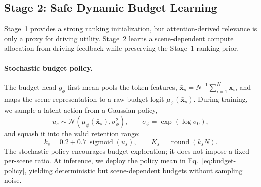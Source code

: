 \documentclass[letterpaper]{article} %
\begin{document}
\subsection{Stage 2: Safe Dynamic Budget Learning}
\label{sec:rl}

Stage~1 provides a strong ranking initialization, but attention-derived
relevance is only a proxy for driving utility. Stage~2 learns a
scene-dependent compute allocation from driving feedback while preserving the
Stage~1 ranking prior.

\paragraph{Stochastic budget policy.}
The budget head $g_\phi$ first mean-pools the token features,
$\bar{\mathbf{x}}_s=N^{-1}\sum_{i=1}^{N}\mathbf{x}_i$, and maps the scene
representation to a raw budget logit $\mu_\phi(\bar{\mathbf{x}}_s)$. During
training, we sample a latent action from a Gaussian policy,
\begin{equation}
 u_s \sim \mathcal{N}\!\left(
 \mu_\phi(\bar{\mathbf{x}}_s),\sigma_\phi^2\right),
 \qquad \sigma_\phi=\exp(\log\sigma_0),
\end{equation}
and squash it into the valid retention range:
\begin{equation}
 k_s = 0.2 + 0.7\,\operatorname{sigmoid}(u_s),
 \qquad K_s=\operatorname{round}(k_sN).
\label{eq:budget-policy}
\end{equation}
The stochastic policy encourages budget exploration; it does not impose a
fixed per-scene ratio. At inference, we deploy the policy mean in
Eq.~\ref{eq:budget-policy}, yielding deterministic but scene-dependent budgets
without sampling noise.
\end{document}
